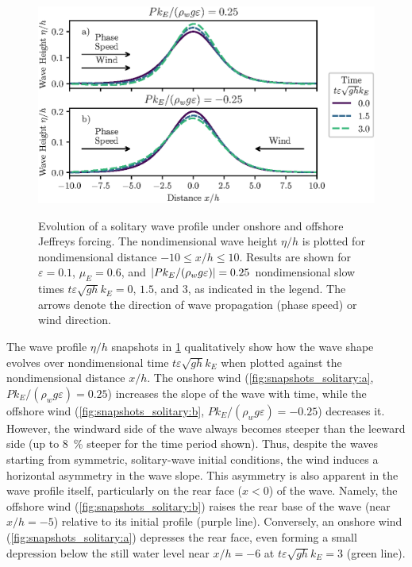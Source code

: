 \documentclass{jfm}
\renewcommand*{\epsilon}{\varepsilon}
\begin{document}
\begin{figure}
  \centering
  { %
    \label{fig:snapshots_solitary:a}
    \label{fig:snapshots_solitary:b}
  }
  \includegraphics{Snapshots-Positive-Negative-Production.eps}
  \caption{
    Evolution of a solitary wave profile under
    onshore and
    offshore Jeffreys forcing.
    The nondimensional wave height $\eta/h$ is plotted for
    nondimensional distance $-10 \le x/h \le 10$.
    Results are shown for $\epsilon=0.1$, $\mu_E = 0.6$, and $\abs{P
    k_E/(\rho_w g \epsilon)} = 0.25$ nondimensional slow times $t
    \epsilon \sqrt{gh} k_E = 0$, $1.5$, and $3$, as indicated in the
    legend.
    The arrows denote the direction of wave propagation (phase speed) or
    wind direction.
  }\label{fig:snapshots_solitary}
\end{figure}

The wave profile $\eta/h$ snapshots in \cref{fig:snapshots_solitary}
qualitatively show how the wave shape evolves over nondimensional time
$t \epsilon \sqrt{g h} k_E$ when plotted against the nondimensional
distance $x/h$.
The onshore wind (\cref{fig:snapshots_solitary:a}, $Pk_E/(\rho_w g
\epsilon) = 0.25$) increases the slope of the wave with time, while the
offshore wind (\cref{fig:snapshots_solitary:b}, $Pk_E/(\rho_w g
\epsilon) = -0.25$) decreases it.
However, the windward side of the wave always becomes steeper than the
leeward side (up to \SI{8}{\percent} steeper for the time period shown).
Thus, despite the waves starting from symmetric, solitary-wave initial
conditions, the wind induces a horizontal asymmetry in the wave slope.
This asymmetry is also apparent in the wave profile itself, particularly
on the rear face ($x<0$) of the wave.
Namely, the offshore wind (\cref{fig:snapshots_solitary:b}) raises the
rear base of the wave (near $x/h = -5$) relative to its initial profile
(purple line).
Conversely, an onshore wind (\cref{fig:snapshots_solitary:a}) depresses
the rear face, even forming a small depression below the still water
level near $x/h = -6$ at $t\epsilon \sqrt{gh} k_E=3$ (green line).
\end{document}
